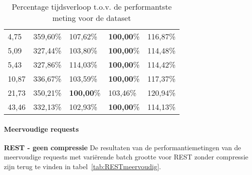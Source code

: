 \begin{table}
\begin{tabular}{lllll}
        4,75 & 359,60\% & 107,62\% & \textbf{100,00}\% & 116,87\% \\
        5,09 & 327,44\% & 103,80\% & \textbf{100,00}\% & 114,48\% \\
        5,43 & 327,86\% & 114,03\% & \textbf{100,00}\% & 114,42\% \\
        10,87 & 336,67\% & 103,59\% & \textbf{100,00}\% & 117,37\% \\
        21,73 & 350,21\% & \textbf{100,00}\% & 103,46\% & 120,94\% \\
        43,46 & 332,13\% & 102,93\% & \textbf{100,00}\% & 114,13\% \\
        \bottomrule
    \end{tabular}
    \caption{Percentage tijdsverloop t.o.v. de performantste meting voor de dataset}
    \label{tab:REST_RESTcompressie_gRPCUni_gRPCMultipercentage}
\end{table}


\paragraph{Meervoudige requests}
\textbf{REST - geen compressie}\newline
De resultaten van de performantiemetingen van de meervoudige requests met vari\"erende batch grootte voor REST zonder compressie zijn terug te vinden in tabel~\ref{tab:RESTmeervoudig}.

